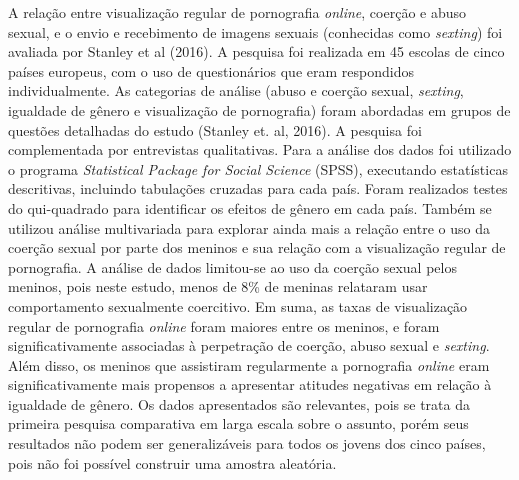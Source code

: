 A relação entre visualização regular de pornografia \textit{online}, coerção e abuso sexual, e o envio e recebimento de imagens sexuais (conhecidas como \textit{sexting}) foi avaliada por Stanley et al (2016). A pesquisa foi realizada em 45 escolas de cinco países europeus, com o uso de questionários que eram respondidos individualmente. As categorias de análise (abuso e coerção sexual, \textit{sexting}, igualdade de gênero e visualização de pornografia) foram abordadas em grupos de questões detalhadas do estudo (Stanley et. al, 2016). A pesquisa foi complementada por entrevistas qualitativas. Para a análise dos dados foi utilizado o programa \textit{Statistical Package for Social Science} (SPSS), executando estatísticas descritivas, incluindo tabulações cruzadas para cada país. Foram realizados testes do qui-quadrado para identificar os efeitos de gênero em cada país. Também se utilizou análise multivariada para explorar ainda mais a relação entre o uso da coerção sexual por parte dos meninos e sua relação com a visualização regular de pornografia. A análise de dados limitou-se ao uso da coerção sexual pelos meninos, pois neste estudo, menos de 8\% de meninas relataram usar comportamento sexualmente coercitivo. Em suma, as taxas de visualização regular de pornografia \textit{online} foram maiores entre os meninos, e foram significativamente associadas à perpetração de coerção, abuso sexual e \textit{sexting}. Além disso, os meninos que assistiram regularmente a pornografia \textit{online} eram significativamente mais propensos a apresentar atitudes negativas em relação à igualdade de gênero. Os dados apresentados são relevantes, pois se trata da primeira pesquisa comparativa em larga escala sobre o assunto, porém seus resultados não podem ser generalizáveis para todos os jovens dos cinco países, pois não foi possível construir uma amostra aleatória. 

